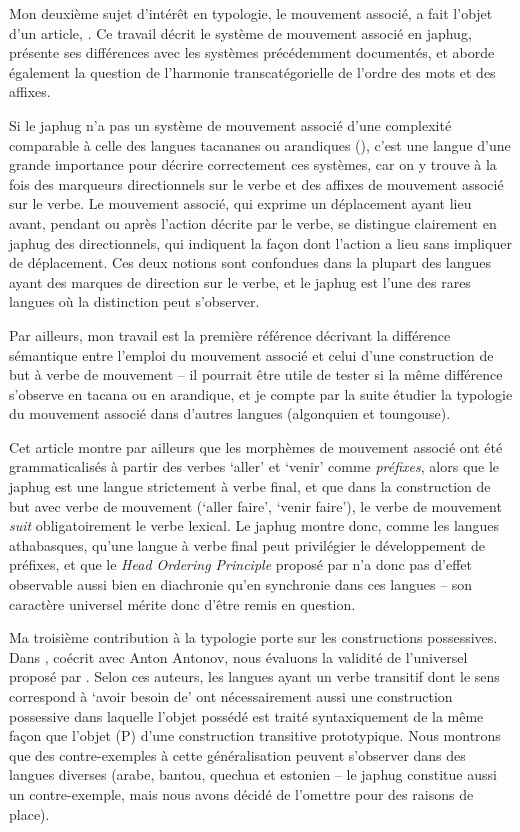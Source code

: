 \documentclass[oldfontcommands,oneside,a4paper,11pt]{article}
\begin{document}
Mon deuxième sujet d'intérêt en typologie, le mouvement associé, a fait l'objet d'un article,  \citet{jacques13harmonization}. Ce travail décrit le système  de mouvement associé en japhug, présente ses différences avec les systèmes précédemment documentés, et aborde également la question de l'harmonie transcatégorielle de l'ordre des mots et des affixes. 

Si  le japhug n'a pas un système de mouvement associé d'une complexité comparable à celle des langues tacananes ou arandiques (\citealt{guillaume09mouv.assoc}), c'est une langue d'une grande importance pour décrire correctement ces systèmes, car on y trouve à la fois des marqueurs directionnels sur le verbe et des affixes de mouvement associé sur le verbe. Le mouvement associé, qui exprime  un déplacement ayant lieu avant, pendant ou après l'action décrite par le verbe, se distingue clairement en japhug  des directionnels, qui indiquent la façon dont l'action a lieu sans impliquer de déplacement. Ces deux notions sont confondues dans la plupart des langues ayant des marques de direction sur le verbe, et le japhug est l'une des rares langues où la distinction peut s'observer.

 Par ailleurs, mon travail est la première référence décrivant la différence sémantique entre l'emploi du mouvement associé et celui d'une construction de but à verbe de mouvement -- il pourrait être utile de tester si la même différence s'observe en tacana ou en arandique, et je compte par la suite étudier la typologie du mouvement associé dans d'autres langues (algonquien et toungouse).

Cet article montre par ailleurs que les morphèmes de mouvement associé ont été grammaticalisés à partir des verbes `aller' et `venir' comme \textit{préfixes}, alors que le japhug est une langue strictement à verbe final, et que dans la construction de but avec verbe de mouvement (`aller faire',  `venir faire'), le verbe de mouvement \textit{suit} obligatoirement le verbe lexical. Le japhug montre donc, comme les langues athabasques, qu'une langue à verbe final peut privilégier le développement de préfixes, et que le \textit{Head Ordering Principle} proposé par \citet{hawkins88prefixing} n'a donc pas d'effet observable aussi bien en diachronie qu'en synchronie dans ces langues -- son caractère universel mérite donc d'être remis en question. 

Ma troisième contribution à la typologie porte sur les constructions possessives. Dans \citet{antonov14need}, coécrit avec Anton Antonov, nous évaluons la validité de l'universel proposé par \citet{harves12need}. Selon ces auteurs, les langues ayant un verbe transitif dont le sens correspond à `avoir besoin de' ont nécessairement aussi une construction possessive dans laquelle l'objet possédé est traité syntaxiquement de la même façon que l'objet (P) d'une construction transitive prototypique. Nous montrons que des contre-exemples à cette généralisation peuvent s'observer dans des langues diverses (arabe, bantou, quechua et estonien -- le japhug constitue aussi un contre-exemple, mais nous avons décidé de l'omettre pour des raisons de place). 
 
\end{document}
